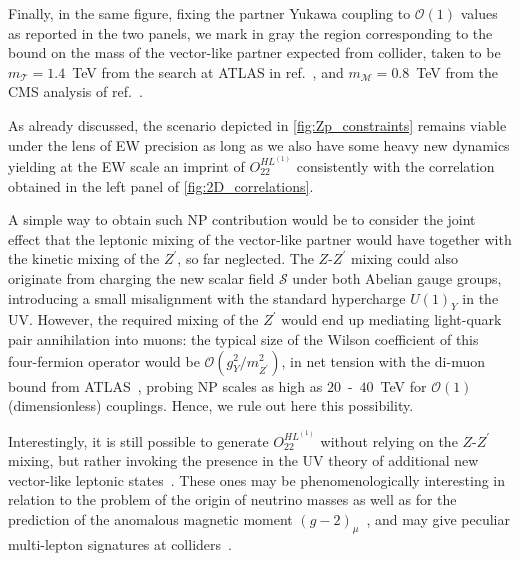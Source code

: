 Finally, in the same figure, fixing the partner Yukawa coupling to  $\mathcal{O}(1)$ values as reported in the two panels, we mark in gray the region corresponding to the bound on the mass of the vector-like partner expected from collider, taken to be $m_{\mathcal{T}} = 1.4$~TeV from the search at ATLAS in ref.~\cite{Aaboud:2018uek}, and $m_{\mathcal{M}} = 0.8$~TeV from the CMS analysis of ref.~\cite{Sirunyan:2019ofn}.

As already discussed, the scenario depicted in \autoref{fig:Zp_constraints} remains viable under the lens of EW precision as long as we also have some heavy new dynamics yielding at the EW scale an imprint of $O^{HL^{(1)}}_{22}$ consistently with the correlation obtained in the left panel of \autoref{fig:2D_correlations}. 

A simple way to obtain such NP contribution would be to consider the joint effect that the leptonic mixing of the vector-like partner would have together with the kinetic mixing of the $Z^{\prime}$, so far neglected. The $Z$-$Z^{\prime}$ mixing could also originate from charging the new scalar field $\mathcal{S}$ under both Abelian gauge groups, introducing a small misalignment with the standard hypercharge $U(1)_{Y}$ in the UV. However, the required mixing of the $Z^{\prime}$ would end up mediating light-quark pair annihilation into muons: the typical size of the Wilson coefficient of this four-fermion operator would be $\mathcal{O}(g_{Y}^2/m^2_{Z^{\prime}})$, in net tension with the di-muon bound from ATLAS~\cite{Aaboud:2017buh}, probing NP scales as high as $20$~-~$40$~TeV for $\mathcal{O}(1)$ (dimensionless) couplings. Hence, we rule out here this possibility.

Interestingly, it is still possible to generate $O^{HL^{(1)}}_{22}$ without relying on the $Z$-$Z^{\prime}$ mixing, but rather invoking the presence in the UV theory of additional new vector-like leptonic states~\cite{Thomas:1998wy,delAguila:2008pw}. These ones may be phenomenologically interesting in relation  to the problem of the origin of neutrino masses as well as for the prediction of the anomalous magnetic moment $(g-2)_{\mu}$~\cite{Kannike:2011ng}, and may give peculiar multi-lepton signatures at colliders~\cite{Kumar:2015tna,Bhattiprolu:2019vdu}.

